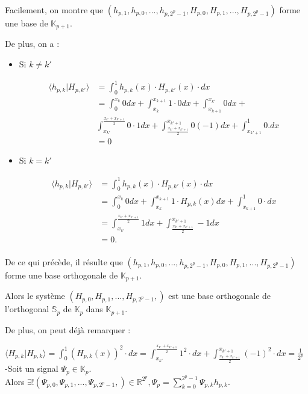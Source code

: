 \documentclass{article}
\begin{document}
Facilement, on montre que $(h_{p,1},h_{p,0},...,h_{p,2^p - 1},H_{p,0},H_{p,1},...,H_{p,2^p - 1})$ forme une base de $\mathbb{K}_{p+1}$.

De plus, on a :

\begin{itemize}

\item Si $k \neq k'$

\begin{align*}
\langle h_{p,k}|H_{p,k'} \rangle &= \int_{0}^1 h_{p,k}(x)\cdot{}H_{p,k'}(x)\cdot{dx} \\ 
&= \int_{0}^{x_k} 0 dx + \int_{x_k}^{x_{k+1}} 1\cdot{}0dx + \int_{x_{k+1}}^{x_{k'}} 0dx + \\
 &\int_{x_{k'}}^{\frac{x_{k'} + x_{k'+1} }{2}} 0\cdot{}1dx + \int_{\frac{x_{k'} + x_{k'+1} }{2}}^{x_{k'+1}} 0(-1)dx + \int_{x_{k'+1}}^{1} 0.dx \\
&= 0
\end{align*} 
\item Si $k =k'$

\begin{align*}
 \langle h_{p,k}|H_{p,k'} \rangle &= \int_{0}^1 h_{p,k}(x)\cdot{}H_{p,k'}(x)\cdot{dx} \\
&= \int_{0}^{x_k} 0dx + \int_{x_k}^{x_{k+1}} 1\cdot{}H_{p,k}(x)dx + \int_{x_{k+1}}^{1} 0\cdot{}dx \\
&= \int_{x_{k'}}^{\frac{x_{k'} + x_{k'+1} }{2}} 1dx + \int_{\frac{x_{k'} + x_{k'+1} }{2}}^{x_{k'+1}} -1dx \\
&= 0 . \\
\end{align*}
\end{itemize}

De ce qui précède, il résulte que $(h_{p,1},h_{p,0},...,h_{p,2^p - 1},H_{p,0},H_{p,1},...,H_{p,2^p - 1})$ forme une base orthogonale de $\mathbb{K}_{p+1}$.

Alors le système $(H_{p,0}, H_{p,1},..., H_{p,2^p - 1},)$ est une base orthogonale de l'orthogonal $\mathbb{S}_{p}$ de $\mathbb{K}_{p}$ dans $\mathbb{K}_{p+1}$.

De plus, on peut déjà remarquer :

$\displaystyle \langle H_{p,k}|H_{p,k} \rangle = \int_0^1 (H_{p,k}(x))^{2}\cdot{}dx = \int_{x_{k'}}^{\frac{x_{k'} + x_{k'+1} }{2}} 1^{2}\cdot{}dx + \int_{\frac{x_{k'} + x_{k'+1} }{2}}^{x_{k'+1}} (-1)^{2}\cdot{}dx = \frac{1}{2^p} $ \\


-Soit un signal $\Psi{}_{p} \in \mathbb{K}_{p}$. \\ Alors $\displaystyle \exists{}! (\Psi{}_{p,0},\Psi{}_{p,1},...,\Psi{}_{p,2^p - 1},) \in \mathbb{R}^{2^p}, \Psi{}_{p} = \sum_{k=0}^{2^p - 1} \Psi{}_{p,k}h_{p,k}$.
\end{document}
